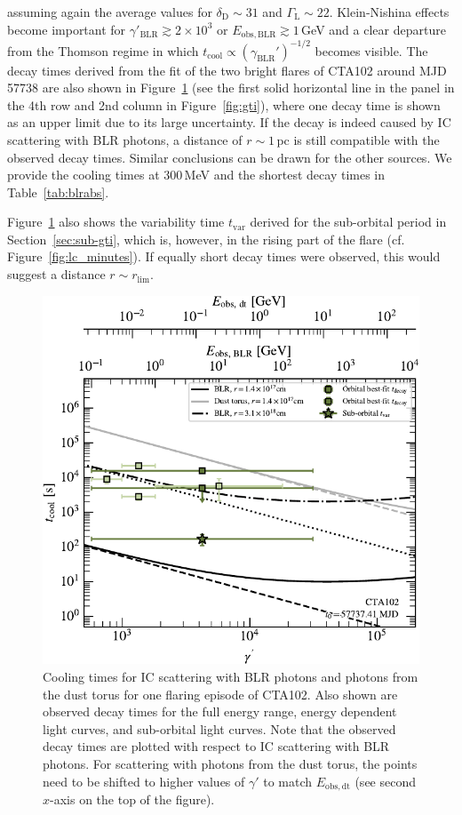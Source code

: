 \documentclass[twocolumn,linenumbers]{aastex62}
\begin{document}
assuming again the average values for $\delta_\mathrm{D}\sim31$ and $\Gamma_\mathrm{L}\sim22$. 
Klein-Nishina effects become important for $\gamma'_\mathrm{BLR} \gtrsim 2\times10^3$ or $E_\mathrm{obs,BLR}\gtrsim1\,$GeV and a clear departure from the Thomson regime in which 
$t_\mathrm{cool}\propto(\gamma_\mathrm{BLR}')^{-1/2}$
becomes visible.
The decay times derived from the fit of the two bright flares of CTA102 around MJD 57738 are also shown in Figure~\ref{fig:tcool}
(see the first solid horizontal line in the panel in the 4th row and 2nd column in Figure~\ref{fig:gti}), where one decay time is shown as an upper limit due to its large uncertainty. 
If the decay is indeed caused by IC scattering with BLR photons, a distance of $r\sim1\,$pc is still compatible with the observed decay times. 
Similar conclusions can be drawn for the other sources. 
We provide the cooling times at 300\,MeV and the shortest decay times in Table~\ref{tab:blrabs}.

Figure~\ref{fig:tcool} also shows the variability time $t_\mathrm{var}$ derived for the sub-orbital period in Section~\ref{sec:sub-gti}, which is, however, in the rising part of the flare (cf. Figure~\ref{fig:lc_minutes}). If equally short decay times were observed, this would suggest a distance $r \sim r_\mathrm{lim}$. 

\begin{figure}
    \centering
    \includegraphics[width = .9\linewidth]{figures/tcool_CTA102_t001_LogParabola_ring.pdf}
    \caption{Cooling times for IC scattering with BLR photons and photons from the dust torus for one flaring episode of CTA102. Also shown are observed decay times for the full energy range, energy dependent light curves, and sub-orbital light curves.
    Note that the observed decay times are plotted with respect to IC scattering with BLR photons. For scattering with photons from the dust torus, the points need to be shifted to higher values of $\gamma'$ to match $E_\mathrm{obs,dt}$ (see second $x$-axis on the top of the figure).}
    \label{fig:tcool}
\end{figure}
\end{document}
